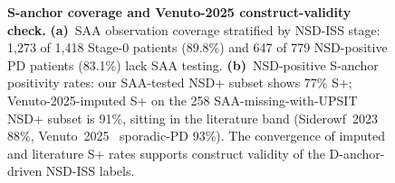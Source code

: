 \documentclass[10pt,letterpaper]{article}
\begin{document}
\begin{figure}[!t]

\caption{\textbf{S-anchor coverage and Venuto-2025 construct-validity check.} \textbf{(a)}~SAA observation coverage stratified by NSD-ISS stage: 1{,}273 of 1{,}418 Stage-0 patients (89.8\%) and 647 of 779 NSD-positive PD patients (83.1\%) lack SAA testing. \textbf{(b)}~NSD-positive S-anchor positivity rates: our SAA-tested NSD+ subset shows 77\% S+; Venuto-2025-imputed S+ on the 258 SAA-missing-with-UPSIT NSD+ subset is 91\%, sitting in the literature band (Siderowf~2023~\cite{siderowf2023} 88\%, Venuto~2025~\cite{venuto2025saa} sporadic-PD 93\%). The convergence of imputed and literature S+ rates supports construct validity of the D-anchor-driven NSD-ISS labels.}
\label{p1:fig:gap-a-saa-coverage}
\end{figure}
\end{document}
